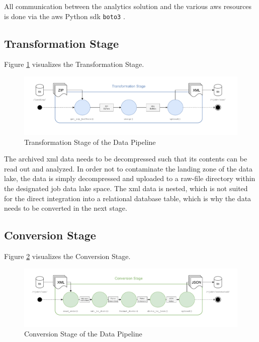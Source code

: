 All communication between the analytics solution and the various \ac{aws} resources is done via the \ac{aws} Python \ac{sdk} \texttt{boto3} \cite{boto3}.

\newpage

\subsection{Transformation Stage}
Figure \ref{fig:3-transform} visualizes the Transformation Stage.

\begin{figure}[h!]
	\includegraphics[width=\linewidth]{main-matter/img/3-3-1-transform}
	\caption{Transformation Stage of the Data Pipeline}
	\label{fig:3-transform}	
\end{figure}

The archived \ac{xml} data needs to be decompressed such that its contents can be read out and analyzed. In order not to contaminate the landing zone of the data lake, the data is simply decompressed and uploaded to a raw-file directory within the designated job data lake space. The \ac{xml} data is nested, which is not suited for the direct integration into a relational database table, which is why the data needs to be converted in the next stage.

\subsection{Conversion Stage} \label{sec:3-3-conversion}
Figure \ref{fig:3-convert} visualizes the Conversion Stage.

\begin{figure}[h!]
	\includegraphics[width=\linewidth]{main-matter/img/3-3-2-convert}
	\caption{Conversion Stage of the Data Pipeline}
	\label{fig:3-convert}	
\end{figure}

